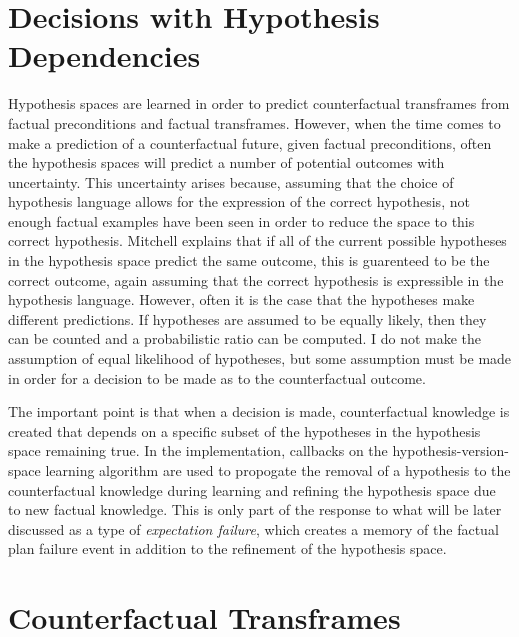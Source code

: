 \section{Decisions with Hypothesis Dependencies}

Hypothesis spaces are learned in order to predict counterfactual
transframes from factual preconditions and factual transframes.
However, when the time comes to make a prediction of a counterfactual
future, given factual preconditions, often the hypothesis spaces will
predict a number of potential outcomes with uncertainty.  This
uncertainty arises because, assuming that the choice of hypothesis
language allows for the expression of the correct hypothesis, not
enough factual examples have been seen in order to reduce the space to
this correct hypothesis.  Mitchell explains that if all of the current
possible hypotheses in the hypothesis space predict the same outcome,
this is guarenteed to be the correct outcome, again assuming that the
correct hypothesis is expressible in the hypothesis language.
However, often it is the case that the hypotheses make different
predictions.  If hypotheses are assumed to be equally likely, then
they can be counted and a probabilistic ratio can be computed.  I do
not make the assumption of equal likelihood of hypotheses, but some
assumption must be made in order for a decision to be made as to the
counterfactual outcome.

The important point is that when a decision is made, counterfactual
knowledge is created that depends on a specific subset of the
hypotheses in the hypothesis space remaining true.  In the
implementation, callbacks on the hypothesis-version-space learning
algorithm are used to propogate the removal of a hypothesis to the
counterfactual knowledge during learning and refining the hypothesis
space due to new factual knowledge.  This is only part of the response
to what will be later discussed as a type of \emph{expectation
  failure}, which creates a memory of the factual plan failure event
in addition to the refinement of the hypothesis space.

\section{Counterfactual Transframes}

